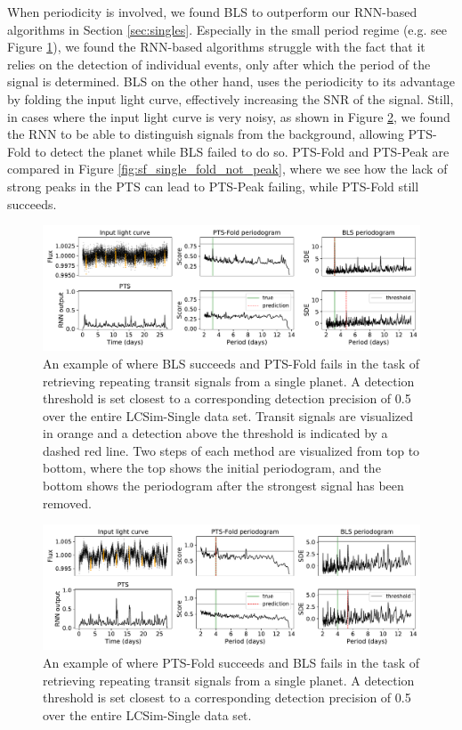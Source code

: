 When periodicity is involved, we found BLS to outperform our RNN-based algorithms in Section \ref{sec:singles}. Especially in the small period regime (e.g. see Figure \ref{fig:sf_single_bls_not_fold}), we found the RNN-based algorithms struggle with the fact that it relies on the detection of individual events, only after which the period of the signal is determined. BLS on the other hand, uses the periodicity to its advantage by folding the input light curve, effectively increasing the SNR of the signal. Still, in cases where the input light curve is very noisy, as shown in Figure \ref{fig:sf_single_fold_not_bls}, we found the RNN to be able to distinguish signals from the background, allowing PTS-Fold to detect the planet while BLS failed to do so. PTS-Fold and PTS-Peak are compared in Figure \ref{fig:sf_single_fold_not_peak}, where we see how the lack of strong peaks in the PTS can lead to PTS-Peak failing, while PTS-Fold still succeeds.

\begin{figure}
    \centering
    \includegraphics[width=\linewidth]{Experiments/Figures/Cases/sf_single_bls_not_fold_2.pdf}
    \caption{An example of where BLS succeeds and PTS-Fold fails in the task of retrieving repeating transit signals from a single planet. A detection threshold is set closest to a corresponding detection precision of 0.5 over the entire LCSim-Single data set. Transit signals are visualized in orange and a detection above the threshold is indicated by a dashed red line. Two steps of each method are visualized from top to bottom, where the top shows the initial periodogram, and the bottom shows the periodogram after the strongest signal has been removed.}
    \label{fig:sf_single_bls_not_fold}
\end{figure}

\begin{figure}
    \centering
    \includegraphics[width=\linewidth]{Experiments/Figures/Cases/sf_single_fold_not_bls_1.pdf}
    \caption{An example of where PTS-Fold succeeds and BLS fails in the task of retrieving repeating transit signals from a single planet. A detection threshold is set closest to a corresponding detection precision of 0.5 over the entire LCSim-Single data set.}
    \label{fig:sf_single_fold_not_bls}
\end{figure}

